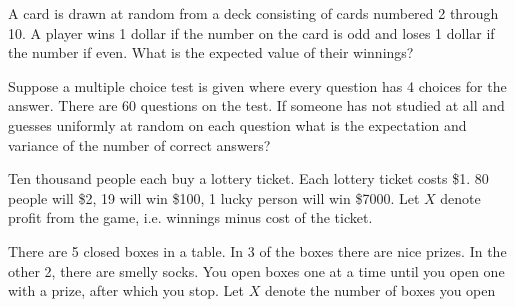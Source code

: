 \documentclass[addpoints,12pt]{exam}
\begin{document}
\begin{questions}
\question[2] A card is drawn at random from a deck consisting of cards numbered 2
through 10. A player wins 1 dollar if the number on the card is odd and
loses 1 dollar if the number if even. What is the expected value of their winnings?

\vspace{1.5in}

\question[3] Suppose a multiple choice test is given where every question has 4 choices for the answer. There are 60 questions on the test. 
If someone has not studied at all and guesses uniformly at random on each question what is the expectation and variance of the number of correct answers?

\vspace{1.5in}

\question[4] Ten thousand people each buy a lottery ticket. Each lottery ticket costs \$1. 80 people will \$2, 19 will win \$100, 1 lucky person will win \$7000.
Let $X$ denote profit from the game, i.e. winnings minus cost of the ticket.

\noaddpoints
{}
\addpoints


\question[6] There are 5 closed boxes in a table. In 3 of the boxes there are nice prizes. In the other 2, there are smelly socks.
You open boxes one at a time until you open one with a prize, after which you stop. Let $X$ denote the number of boxes you open

\noaddpoints
\begin{parts}

\end{parts}
\end{questions}
\end{document}
